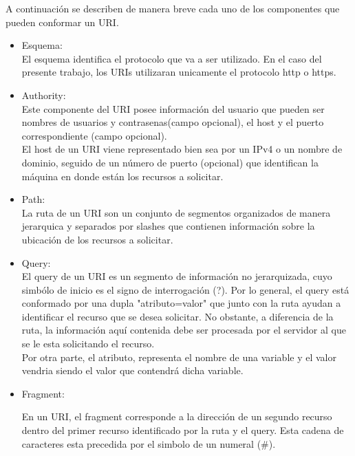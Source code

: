 \documentclass{article}
\begin{document}
A continuaci\'on se describen de manera breve cada uno de los componentes que pueden conformar un URI.

\begin{itemize}

\item Esquema:\\

El esquema identifica el protocolo que va a ser utilizado. En el caso del presente trabajo, los URIs utilizaran unicamente el protocolo http o https.\\


\item Authority:\\

Este componente del URI posee informaci\'on del usuario que pueden ser nombres de usuarios y contrasenas(campo opcional), el host y el puerto correspondiente (campo opcional).\\

El host de un URI viene representado bien sea por un IPv4 o un nombre de dominio, seguido de un n\'umero de puerto (opcional) que identifican la m\'aquina en donde est\'an los recursos a solicitar.\\
   
\item Path:\\
La ruta de un URI son un conjunto de segmentos organizados de manera jerarquica y separados por slashes que contienen informaci\'on sobre la ubicaci\'on de los recursos a solicitar.\\

\item Query:\\

El query de un URI es un segmento de informaci\'on no jerarquizada, cuyo simb\'olo de inicio es el signo de interrogaci\'on (?). Por lo general, el query est\'a conformado por una dupla "atributo=valor" que junto con la ruta ayudan a identificar el recurso que se desea solicitar. No obstante, a diferencia de la ruta, la informaci\'on aqu\'i contenida debe ser procesada por el servidor al que se le esta solicitando el recurso. \\
Por otra parte, el atributo, representa el nombre de una variable y el valor vendria siendo el valor que contendr\'a dicha variable.\\

\item Fragment:

En un URI, el fragment corresponde a la direcci\'on de un segundo recurso dentro del primer recurso identificado por la ruta y el query. Esta cadena de caracteres esta precedida por el simbolo de un numeral (\#).\\

\end{itemize}
\end{document}
